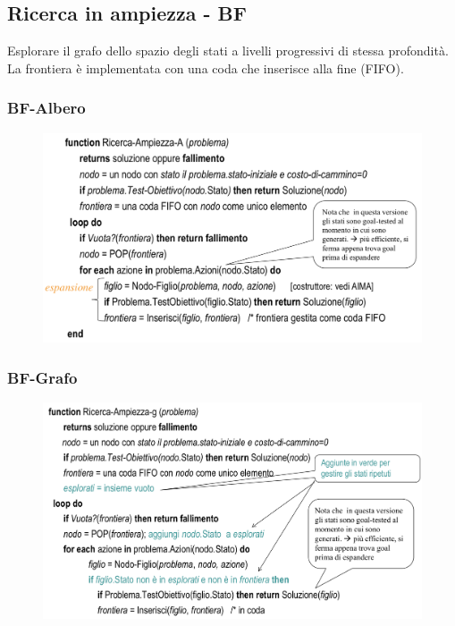 \documentclass{article}
\begin{document}
\subsection{Ricerca in ampiezza - BF}
Esplorare il grafo dello spazio degli stati a livelli progressivi di stessa profondità. La frontiera è implementata con una coda che inserisce alla fine (FIFO).
\subsubsection{BF-Albero}
\begin{figure}[H]
    \centering
    \includegraphics[scale=0.4]{Images/BFA.png}
\end{figure}

\subsubsection{BF-Grafo}
\begin{figure}[H]
    \centering
    \includegraphics[scale=0.45]{Images/BFG.png}
\end{figure}
\end{document}
